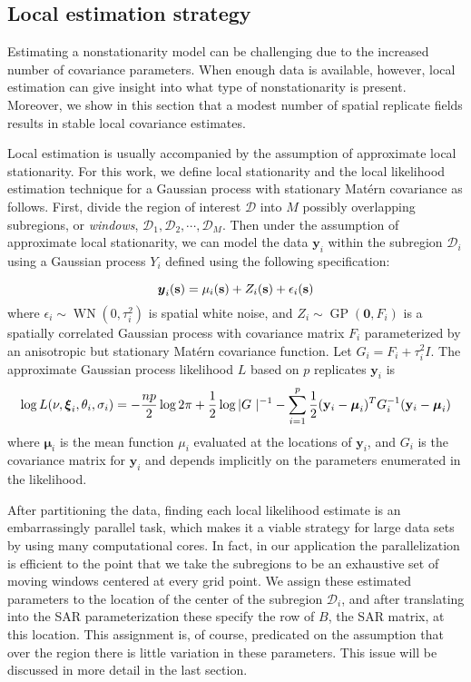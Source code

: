 \documentclass[review]{elsarticle}
\begin{document}
\subsection{Local estimation strategy}

Estimating a nonstationarity model can be challenging due to the increased number of covariance parameters. When enough data is available, however, local estimation can give insight into what type of nonstationarity is present. Moreover, we show in this section that a modest  number of spatial replicate fields results in stable local covariance estimates. 

Local estimation is usually accompanied by the assumption of approximate local stationarity. For this work, we define local stationarity and the local likelihood estimation technique for a Gaussian process with stationary Mat\'ern covariance as follows. First, divide the region of interest $\mathcal{D}$ into $M$ possibly overlapping subregions, or {\it windows},  $\mathcal{D}_1, \mathcal{D}_2, \cdots, \mathcal{D}_M$. Then under the assumption of approximate local stationarity, we can model the data $\mathbf y_i$ within the subregion $\mathcal{D}_i$ using a Gaussian process $Y_i$ defined using the following specification:

\begin{equation}
\label{e:4}
\mbox{\boldmath $y$}_i(\mathbf s) = \mu_i(\mathbf s) + Z_i (\mathbf s) + \epsilon_i (\mathbf s)    
\end{equation}
where $\epsilon_i \sim \operatorname{WN}(0, \tau_i^2)$ is spatial white noise, and $Z_i \sim \operatorname{GP}( \mathbf 0, F_i)$ is a spatially correlated Gaussian process with covariance matrix $F_i$ parameterized by an anisotropic but  stationary Mat\'ern covariance function. Let $G_i = F_i + \tau_i^2 I$. The approximate Gaussian process likelihood $L$  based on  $p$ replicates $\mathbf y_i$ is
\begin{equation}
\label{e:5}
     \log L(\nu, \mbox{\boldmath $\xi$}_i, \theta_i,  \sigma_i)  = - \frac{n p}{2} \log 2 \pi + \frac{1}{2} \log | G \ |^{-1} - \sum_{i=1}^p \frac{1}{2}(\mathbf y_i - \boldsymbol \mu_i )^T G_i^{-1} (\mathbf y_i - \boldsymbol \mu_i)
\end{equation}
where $\boldsymbol{\mu}_i$ is the mean function $\mu_i$ evaluated at the locations of $\mathbf y_i$, and $G_i$ is the covariance matrix for $\mathbf y_i$ and depends implicitly on the parameters enumerated in the likelihood.  %

After partitioning the data, finding each local likelihood estimate is an embarrassingly parallel task,
 which makes it a viable strategy for large data sets by using many computational cores. In fact, in our application the parallelization is efficient to the point that we take  the subregions to be an exhaustive set of moving windows centered at every grid point. 
We assign these estimated parameters to the location of the center of the subregion $\mathcal{D}_i$, and
after translating into the SAR parameterization these specify the row of $B$, the SAR matrix, at this location. This assignment is, of course, predicated on the assumption that over the region there is little variation in these parameters. This issue will be discussed in more detail in the last section. 
\end{document}
